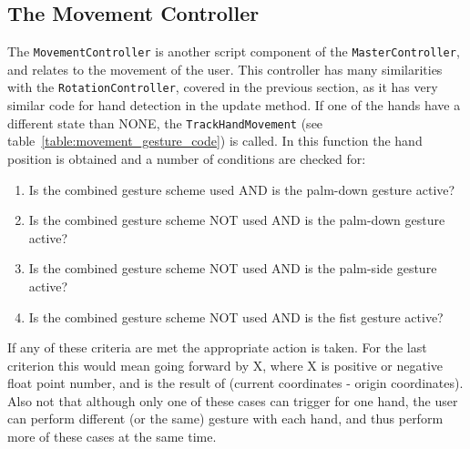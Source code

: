 
\subsection{The Movement Controller}
The \texttt{MovementController} is another script component of the \texttt{MasterController}, and relates to the movement of the user. 
This controller has many similarities with the \texttt{RotationController}, covered in the previous section, as it has very similar
code for hand detection in the update method. If one of the hands have a different state than NONE, the \texttt{TrackHandMovement} 
(see table~\vref{table:movement_gesture_code}) is called. In this function the hand position is obtained and a number of conditions are checked for:

\begin{enumerate}
    \item Is the combined gesture scheme used AND is the palm-down gesture active?
    \item Is the combined gesture scheme NOT used AND is the palm-down gesture active?
    \item Is the combined gesture scheme NOT used AND is the palm-side gesture active?
    \item Is the combined gesture scheme NOT used AND is the fist gesture active?
\end{enumerate}

If any of these criteria are met the appropriate action is taken. 
For the last criterion this would mean going forward by X, where X is positive or negative float point number, 
and is the result of (current coordinates - origin coordinates). Also not that although only one of these cases can trigger for one hand, the user can 
perform different (or the same) gesture with each hand, and thus perform more of these cases at the same time.

